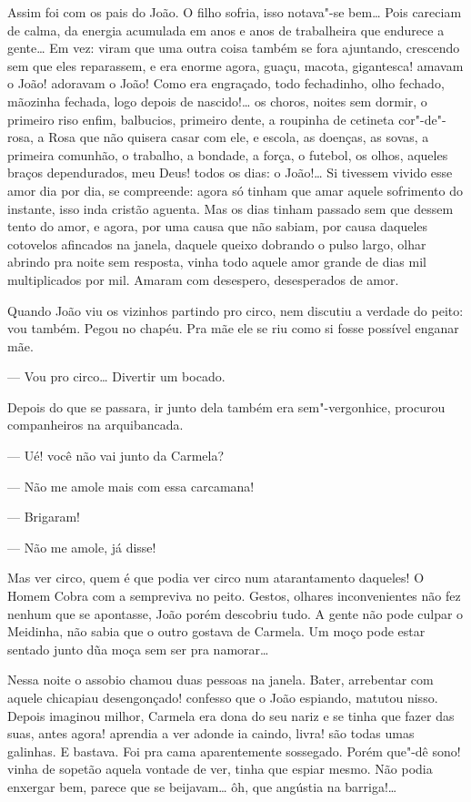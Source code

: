 \begin{linenumbers}
Assim foi com os pais do João. O filho sofria, isso notava"-se bem\ldots{}
Pois careciam de calma, da energia acumulada em anos e anos de
trabalheira que endurece a gente\ldots{} Em vez: viram que uma outra coisa
também se fora ajuntando, crescendo sem que eles reparassem, e era
enorme agora, guaçu, macota, gigantesca! amavam o João! adoravam o João!
Como era engraçado, todo fechadinho, olho fechado, mãozinha fechada,
logo depois de nascido!\ldots{} os choros, noites sem dormir, o primeiro riso
enfim, balbucios, primeiro dente, a roupinha de cetineta cor"-de"-rosa, a
Rosa que não quisera casar com ele, e escola, as doenças, as sovas, a
primeira comunhão, o trabalho, a bondade, a força, o futebol, os olhos,
aqueles braços dependurados, meu Deus! todos os dias: o João!\ldots{} Si
tivessem vivido esse amor dia por dia, se compreende: agora só tinham
que amar aquele sofrimento do instante, isso inda cristão aguenta. Mas
os dias tinham passado sem que dessem tento do amor, e agora, por uma
causa que não sabiam, por causa daqueles cotovelos afincados na janela,
daquele queixo dobrando o pulso largo, olhar abrindo pra noite sem
resposta, vinha todo aquele amor grande de dias mil multiplicados por
mil. Amaram com desespero, desesperados de amor.

Quando João viu os vizinhos partindo pro circo, nem discutiu a verdade
do peito: vou também. Pegou no chapéu. Pra mãe ele se riu como si fosse
possível enganar mãe.

--- Vou pro circo\ldots{} Divertir um bocado.

Depois do que se passara, ir junto dela também era sem"-vergonhice,
procurou companheiros na arquibancada.

--- Ué! você não vai junto da Carmela?

--- Não me amole mais com essa carcamana!

--- Brigaram!

--- Não me amole, já disse!

Mas ver circo, quem é que podia ver circo num atarantamento daqueles! O
Homem Cobra com a sempreviva no peito. Gestos, olhares inconvenientes
não fez nenhum que se apontasse, João porém descobriu tudo. A gente não
pode culpar o Meidinha, não sabia que o outro gostava de Carmela. Um
moço pode estar sentado junto dũa moça sem ser pra namorar\ldots{}

Nessa noite o assobio chamou duas pessoas na janela. Bater, arrebentar
com aquele chicapiau desengonçado! confesso que o João espiando, matutou
nisso. Depois imaginou milhor, Carmela era dona do seu nariz e se tinha
que fazer das suas, antes agora! aprendia a ver adonde ia caindo, livra!
são todas umas galinhas. E bastava. Foi pra cama aparentemente
sossegado. Porém que"-dê sono! vinha de sopetão aquela vontade de ver,
tinha que espiar mesmo. Não podia enxergar bem, parece que se
beijavam\ldots{} ôh, que angústia na barriga!\ldots{} 


\end{linenumbers}

